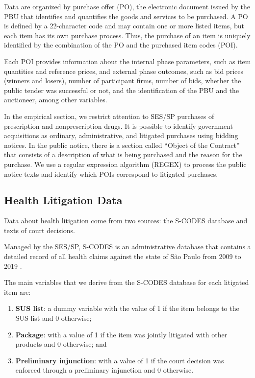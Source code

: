 
Data are organized by purchase offer (PO), the electronic document issued by the PBU that identifies and quantifies the goods and services to be purchased. A PO is defined by a 22-character code and may contain one or more listed items, but each item has its own purchase process. Thus, the purchase of an item is uniquely identified by the combination of the PO and the purchased item codes (POI).

Each POI provides information about the internal phase parameters, such as item quantities and reference prices, and external phase outcomes, such as bid prices (winners and losers), number of participant firms, number of bids, whether the public tender was successful or not, and the identification of the PBU and the auctioneer, among other variables.

In the empirical section, we restrict attention to SES/SP purchases of prescription and nonprescription drugs. It is possible to identify government acquisitions as ordinary, administrative, and litigated purchases using bidding notices. In the public notice, there is a section called “Object of the Contract” that consists of a description of what is being purchased and the reason for the purchase. We use a regular expression algorithm (REGEX) to process the public notice texts and identify which POIs correspond to litigated purchases.

\subsection{Health Litigation Data}
Data about health litigation come from two sources: the S-CODES database and texts of court decisions.

Managed by the SES/SP, S-CODES is an administrative database that contains a detailed record of all health claims against the state of São Paulo from 2009 to 2019 \citep{cnj2019judicializacao}. 

The main variables that we derive from the S-CODES database for each litigated item are: 
\begin{enumerate}
  \item \textbf{SUS list}: a dummy variable with the value of 1 if the item belongs to the SUS list and 0 otherwise;
  \item \textbf{Package}: with a value of 1 if the item was jointly litigated with other products and 0 otherwise; and
  \item \textbf{Preliminary injunction}: with a value of 1 if the court decision was enforced through a preliminary injunction and 0 otherwise.
\end{enumerate}


